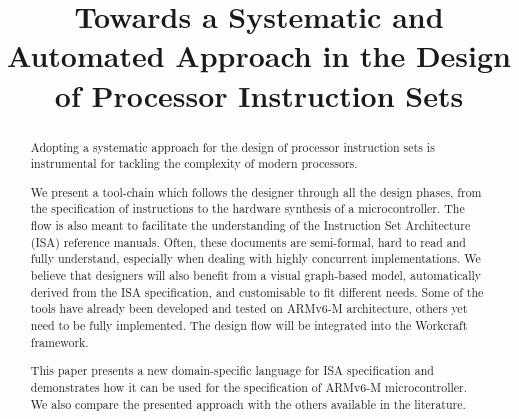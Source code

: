 \documentclass[conference]{IEEEtran}
\begin{document}


\title{Towards a Systematic and Automated Approach in the Design of Processor Instruction Sets}

\author{
\and
{}
}

\maketitle

\begin{abstract}
Adopting a systematic approach for the design of processor instruction sets is
instrumental for tackling the complexity of modern processors.

We present a tool-chain which follows the designer through all the design phases,
from the specification of instructions to the hardware synthesis of a
microcontroller. The flow is also meant to facilitate the understanding of the
Instruction Set Architecture (ISA) reference manuals. Often, these documents are
semi-formal, hard to read and fully understand, especially when dealing with
highly concurrent implementations. We believe that designers will also
benefit from a visual graph-based model, automatically derived from the ISA
specification, and customisable to fit different needs. Some of the tools have
already been developed and tested on ARMv6-M architecture, others yet need to be
fully implemented. The design flow will be integrated into the Workcraft framework.

This paper presents a new domain-specific language for ISA specification and demonstrates
how it can be used for the specification of ARMv6-M microcontroller. We also compare
the presented approach with the others available in the literature.
\end{abstract}
\end{document}
